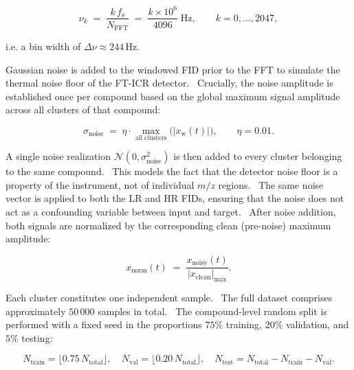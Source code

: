 \documentclass[12pt,a4paper]{report}
\begin{document}
\begin{equation}
\nu_k \;=\; \frac{k\,f_{\mathrm{s}}}{N_{\mathrm{FFT}}}
\;=\; \frac{k \times 10^{6}}{4096}\;\mathrm{Hz},
\qquad k = 0,\dots,2047,
\end{equation}

i.e. a bin width of $\Delta\nu \approx 244\,$Hz.

Gaussian noise is added to the windowed FID prior to the FFT to simulate the
thermal noise floor of the FT-ICR detector.  Crucially, the noise amplitude is
established once per compound based on the global maximum signal amplitude across
all clusters of that compound:

\begin{equation}
\sigma_{\mathrm{noise}} \;=\; \eta \cdot
\max_{\mathrm{all\;clusters}}\!\bigl(|x_{\mathrm{w}}(t)|\bigr),
\qquad
\eta = 0.01.
\label{eq:noise_level}
\end{equation}

A single noise realization $\mathcal{N}(0,\sigma_{\mathrm{noise}}^2)$ is then
added to every cluster belonging to the same compound.  This models the fact
that the detector noise floor is a property of the instrument, not of
individual $m/z$ regions.  The same noise vector is applied to both the LR and
HR FIDs, ensuring that the noise does not act as a confounding variable between
input and target.  After noise addition, both signals are normalized by the
corresponding clean (pre-noise) maximum amplitude:

\begin{equation}
x_{\mathrm{norm}}(t) \;=\; \frac{x_{\mathrm{noisy}}(t)}
                              {|x_{\mathrm{clean}}|_{\max}}.
\label{eq:normalization}
\end{equation}

Each cluster constitutes one independent sample.  The full dataset comprises
approximately $50\,000$ samples in total.  The compound-level random split is
performed with a fixed seed in the proportions $75\%$ training, $20\%$
validation, and $5\%$ testing:

\begin{equation}
N_{\mathrm{train}} = \bigl\lfloor 0.75\,N_{\mathrm{total}}\bigr\rfloor,
\quad
N_{\mathrm{val}}    = \bigl\lfloor 0.20\,N_{\mathrm{total}}\bigr\rfloor,
\quad
N_{\mathrm{test}}   = N_{\mathrm{total}} - N_{\mathrm{train}} - N_{\mathrm{val}}.
\end{equation}
\end{document}
